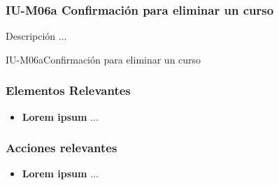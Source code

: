 
\subsubsection{IU-M06a Confirmación para eliminar un curso}

 Descripción ...

        {IU-M06a}{Confirmación para eliminar un curso}

\subsubsection{Elementos Relevantes}

    \begin{itemize}
    \item {\bf Lorem ipsum}
        ...
    \end{itemize}

\subsubsection{Acciones relevantes}

    \begin{itemize}
    \item {\bf Lorem ipsum}
        ...
    \end{itemize}

\clearpage
